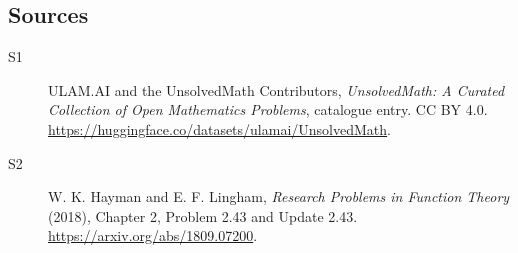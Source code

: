 \documentclass[11pt]{article}
\begin{document}
\subsection{Sources}
\begin{description}
\item[\hypertarget{source:statement:1}{S1}] ULAM.AI and the UnsolvedMath Contributors, \emph{UnsolvedMath: A Curated Collection of Open Mathematics Problems}, catalogue entry. CC BY 4.0. \url{https://huggingface.co/datasets/ulamai/UnsolvedMath}.
\item[\hypertarget{source:statement:2}{S2}] W. K. Hayman and E. F. Lingham, \emph{Research Problems in Function Theory} (2018), Chapter 2, Problem 2.43 and Update 2.43. \url{https://arxiv.org/abs/1809.07200}.
\end{description}
\label{end:statement}
\end{document}
